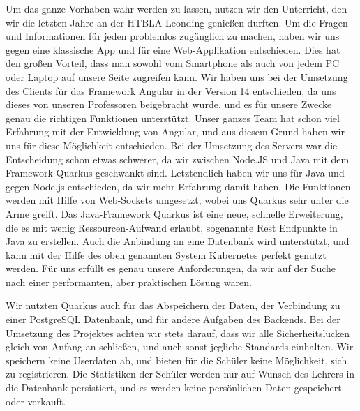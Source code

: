 Um das ganze Vorhaben wahr werden zu lassen, nutzen wir den Unterricht, den wir die letzten Jahre an der HTBLA Leonding genießen durften. Um die Fragen und Informationen für jeden problemlos zugänglich zu machen, haben wir uns gegen eine klassische App und für eine Web-Applikation entschieden. Dies hat den großen Vorteil, dass man sowohl vom Smartphone als auch von jedem PC oder Laptop auf unsere Seite zugreifen kann. Wir haben uns bei der Umsetzung des Clients für das Framework Angular in der Version 14 entschieden, da uns dieses von unseren Professoren beigebracht wurde, und es für unsere Zwecke genau die richtigen Funktionen unterstützt. Unser ganzes Team hat schon viel Erfahrung mit der Entwicklung von Angular, und aus diesem Grund haben wir uns für diese Möglichkeit entschieden. Bei der Umsetzung des Servers war die Entscheidung schon etwas schwerer, da wir zwischen Node.JS und Java mit dem Framework Quarkus geschwankt sind. Letztendlich haben wir uns für Java und gegen Node.js entschieden, da wir mehr Erfahrung damit haben. Die Funktionen werden mit Hilfe von Web-Sockets umgesetzt, wobei uns Quarkus sehr unter die Arme greift. Das Java-Framework Quarkus ist eine neue, schnelle Erweiterung, die es mit wenig Ressourcen-Aufwand erlaubt, sogenannte Rest Endpunkte in Java zu erstellen. Auch die Anbindung an eine Datenbank wird unterstützt, und kann mit der Hilfe des oben genannten System Kubernetes perfekt genutzt werden. Für uns erfüllt es genau unsere Anforderungen, da wir auf der Suche nach einer performanten, aber praktischen Lösung waren.  

  

  

Wir nutzten Quarkus auch für das Abspeichern der Daten, der Verbindung zu einer PostgreSQL Datenbank, und für andere Aufgaben des Backends. Bei der Umsetzung des Projektes achten wir stets darauf, dass wir alle Sicherheitslücken gleich von Anfang an schließen, und auch sonst jegliche Standards einhalten. Wir speichern keine Userdaten ab, und bieten für die Schüler keine Möglichkeit, sich zu registrieren. Die Statistiken der Schüler werden nur auf Wunsch des Lehrers in die Datenbank persistiert, und es werden keine persönlichen Daten gespeichert oder verkauft.  

  

